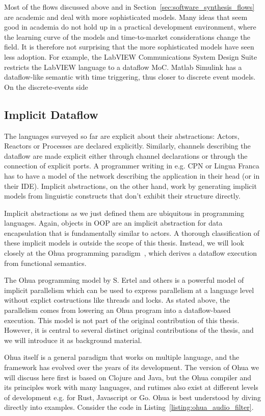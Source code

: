 Most of the flows discussed above and in Section~\ref{sec:software_synthesis_flows} are academic and deal with more sophisticated models. 
Many ideas that seem good in academia do not hold up in a practical development environment, where the learning curve of the models and time-to-market considerations change the field.
It is therefore not surprising that the more sophisticated models have seen less adoption.
For example, the LabVIEW Communications System Design Suite restricts the LabVIEW language to a dataflow \ac{MoC}.
Matlab Simulink has a dataflow-like semantic with time triggering, thus closer to discrete event models.
On the discrete-events side 

\subsection{Implicit Dataflow}

The languages surveyed so far are explicit about their abstractions: Actors, Reactors or Processes are declared explicitly.
Similarly, channels describing the dataflow are made explicit either through channel declarations or through the connection of explicit ports.
A programmer writing in e.g. \ac{CPN} or Lingua Franca has to have a model of the network describing the application in their head (or in their \acs{IDE}).
Implicit abstractions, on the other hand, work by generating implicit models from linguistic constructs that don't exhibit their structure directly.

Implicit abstractions as we just defined them are ubiquitous in programming languages.
Again, objects in \ac{OOP} are an implicit abstraction for data encapsulation that is fundamentally similar to actors.
A thorough classification  of these implicit models is outside the scope of this thesis.
Instead, we will look closely at the Ohua programming paradigm~\cite{ertel_phdthesis}, which derives a dataflow execution from functional semantics.

The Ohua programming model by S. Ertel and others is a powerful model of implicit parallelism which can be used to express parallelism at a language level without explict costructions like threads and locks. 
As stated above, the parallelism comes from lowering an Ohua program into a dataflow-based execution.
This model is not part of the original contribution of this thesis.
However, it is central to several distinct original contributions of the thesis, and we will introduce it as background material.

Ohua itself is a general paradigm that works on multiple language, and the framework has evolved over the years of its development.
The version of Ohua we will discuss here first is based on Clojure and Java, but the Ohua compiler and its principles work with many languages,
and rutimes also exist at different levels of development e.g. for Rust, Javascript or Go.
Ohua is best understood by diving directly into examples. Consider the code in Listing~\ref{listing:ohua_audio_filter}.

